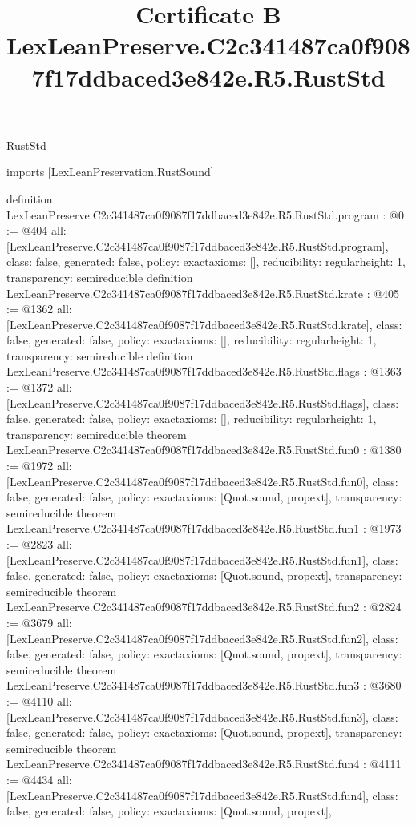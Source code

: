 \begin{lexlean}{RustStd}
\title{Certificate B LexLeanPreserve.C2c341487ca0f9087f17ddbaced3e842e.R5.RustStd}
\begin{coremodule}
imports [LexLeanPreservation.RustSound]

definition LexLeanPreserve.C2c341487ca0f9087f17ddbaced3e842e.R5.RustStd.program : @0 := @404 {
  all: [LexLeanPreserve.C2c341487ca0f9087f17ddbaced3e842e.R5.RustStd.program],
  class: false,
  generated: false,
  policy: exact{axioms: []},
  reducibility: regular{height: 1},
  transparency: semireducible
}
definition LexLeanPreserve.C2c341487ca0f9087f17ddbaced3e842e.R5.RustStd.krate : @405 := @1362 {
  all: [LexLeanPreserve.C2c341487ca0f9087f17ddbaced3e842e.R5.RustStd.krate],
  class: false,
  generated: false,
  policy: exact{axioms: []},
  reducibility: regular{height: 1},
  transparency: semireducible
}
definition LexLeanPreserve.C2c341487ca0f9087f17ddbaced3e842e.R5.RustStd.flags : @1363 := @1372 {
  all: [LexLeanPreserve.C2c341487ca0f9087f17ddbaced3e842e.R5.RustStd.flags],
  class: false,
  generated: false,
  policy: exact{axioms: []},
  reducibility: regular{height: 1},
  transparency: semireducible
}
theorem LexLeanPreserve.C2c341487ca0f9087f17ddbaced3e842e.R5.RustStd.fun0 : @1380 := @1972 {
  all: [LexLeanPreserve.C2c341487ca0f9087f17ddbaced3e842e.R5.RustStd.fun0],
  class: false,
  generated: false,
  policy: exact{axioms: [Quot.sound, propext]},
  transparency: semireducible
}
theorem LexLeanPreserve.C2c341487ca0f9087f17ddbaced3e842e.R5.RustStd.fun1 : @1973 := @2823 {
  all: [LexLeanPreserve.C2c341487ca0f9087f17ddbaced3e842e.R5.RustStd.fun1],
  class: false,
  generated: false,
  policy: exact{axioms: [Quot.sound, propext]},
  transparency: semireducible
}
theorem LexLeanPreserve.C2c341487ca0f9087f17ddbaced3e842e.R5.RustStd.fun2 : @2824 := @3679 {
  all: [LexLeanPreserve.C2c341487ca0f9087f17ddbaced3e842e.R5.RustStd.fun2],
  class: false,
  generated: false,
  policy: exact{axioms: [Quot.sound, propext]},
  transparency: semireducible
}
theorem LexLeanPreserve.C2c341487ca0f9087f17ddbaced3e842e.R5.RustStd.fun3 : @3680 := @4110 {
  all: [LexLeanPreserve.C2c341487ca0f9087f17ddbaced3e842e.R5.RustStd.fun3],
  class: false,
  generated: false,
  policy: exact{axioms: [Quot.sound, propext]},
  transparency: semireducible
}
theorem LexLeanPreserve.C2c341487ca0f9087f17ddbaced3e842e.R5.RustStd.fun4 : @4111 := @4434 {
  all: [LexLeanPreserve.C2c341487ca0f9087f17ddbaced3e842e.R5.RustStd.fun4],
  class: false,
  generated: false,
  policy: exact{axioms: [Quot.sound, propext]},
}
\end{coremodule}
\end{lexlean}
